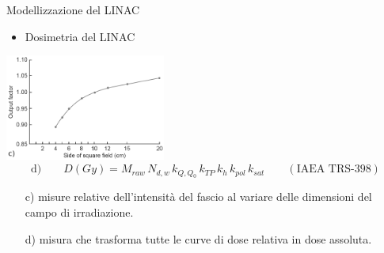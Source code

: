 \documentclass{beamer}
\begin{document}
\begin{frame}{Modellizzazione del LINAC}
\begin{itemize}
\scriptsize
{}
\item \alert{Dosimetria del LINAC}
\end{itemize}
\vspace{.75cm}
\centering
\includegraphics[height=3.5cm]{../cap2/of.png}
\scriptsize
$$\text{d)}\qquad D(Gy) = M_{raw}\,N_{d,w}\,k_{Q,Q_0}\,k_{TP}\,k_h\,k_{pol}\,k_{sat}\qquad (\textrm{IAEA TRS-398})$$
\begin{itemize}
\scriptsize
\item[c)]  misure relative dell'intensità del fascio al variare delle dimensioni del campo di irradiazione.
\item[d)]  misura che trasforma tutte le curve di dose relativa in dose assoluta.
\end{itemize}
\end{frame}
\end{document}
